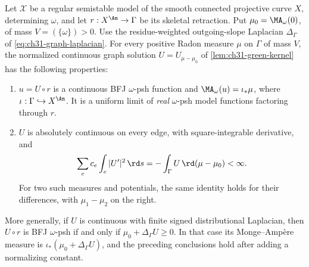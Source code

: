 \begin{lemma}
\label{lem:ch26-weighted-graph-real-bfj}
Let \(\mathcal X\) be a regular semistable model of the smooth connected
projective curve \(X\), determining \(\omega\), and let
\(r:X^{\An}\to\Gamma\) be its skeletal retraction.  Put
\(\mu_0=\MA_\omega(0)\), of mass \(V=(\{\omega\})>0\).
Use the residue-weighted outgoing-slope Laplacian
\(\Delta_\Gamma\) of \eqref{eq:ch31-graph-laplacian}.
For every positive Radon measure \(\mu\) on \(\Gamma\) of mass \(V\),
the normalized continuous graph solution
\(U=U_{\mu-\mu_0}\) of \cref{lem:ch31-green-kernel} has the following
properties:
\begin{enumerate}
\item\label{itm:ch26-weighted:bfj}
 \(u=U\circ r\) is a continuous BFJ \(\omega\)-psh function and
 \(\MA_\omega(u)=\iota_*\mu\), where \(\iota:\Gamma\hookrightarrow X^{\An}\).
 It is a uniform limit of \emph{real} \(\omega\)-psh model functions
 factoring through \(r\).
\item\label{itm:ch26-weighted:energy}
 \(U\) is absolutely continuous on every edge, with square-integrable
 derivative, and
 \begin{equation}
 \label{eq:ch26-weighted-green-ibp}
 \sum_e c_e\int_e|U'|^2\,\rd s
       =-\int_\Gamma U\,\rd(\mu-\mu_0)<\infty.
 \end{equation}
 For two such measures and potentials, the same identity holds for
 their differences, with \(\mu_1-\mu_2\) on the right.
\end{enumerate}
More generally, if \(U\) is continuous with finite signed distributional
Laplacian, then \(U\circ r\) is BFJ \(\omega\)-psh if and only if
\(\mu_0+\Delta_\Gamma U\geq0\).  In that case its Monge--Amp\`ere
measure is \(\iota_*(\mu_0+\Delta_\Gamma U)\), and the preceding
conclusions hold after adding a normalizing constant.
\end{lemma}


